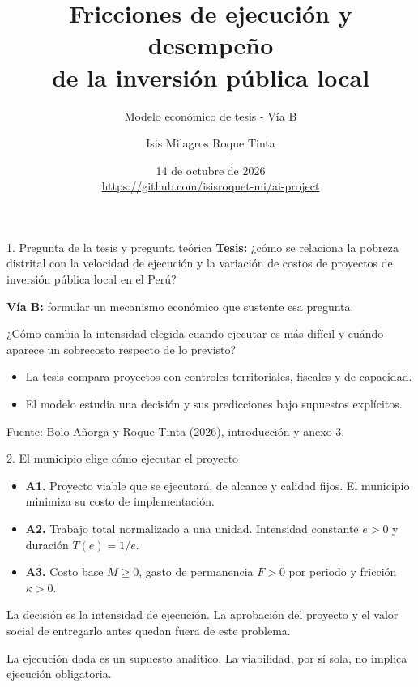 \documentclass[11pt,aspectratio=169]{beamer}
\title{Fricciones de ejecución y desempeño\\de la inversión pública local}
\subtitle{Modelo económico de tesis - Vía B}
\author{Isis Milagros Roque Tinta}
\institute{Universidad del Pacífico - Modelamiento Económico}
\date{14 de octubre de 2026\\[6pt]\small\url{https://github.com/isisroquet-mi/ai-project}}
\newcommand{\notefoot}[1]{\vfill{\scriptsize\color{navy!75}#1}}
\newcommand{\lead}[1]{\begin{block}{}#1\end{block}}
\begin{document}
\begin{frame}\titlepage\end{frame}

\begin{frame}{1. Pregunta de la tesis y pregunta teórica}
\textbf{Tesis:} ¿cómo se relaciona la pobreza distrital con la velocidad de ejecución y la variación de costos de proyectos de inversión pública local en el Perú?
\par\vspace{5mm}
\textbf{Vía B:} formular un mecanismo económico que sustente esa pregunta.
\lead{¿Cómo cambia la intensidad elegida cuando ejecutar es más difícil y cuándo aparece un sobrecosto respecto de lo previsto?}
\begin{itemize}
\item La tesis compara proyectos con controles territoriales, fiscales y de capacidad.
\item El modelo estudia una decisión y sus predicciones bajo supuestos explícitos.
\end{itemize}
\notefoot{Fuente: Bolo Añorga y Roque Tinta (2026), introducción y anexo 3.}
\end{frame}

\begin{frame}{2. El municipio elige cómo ejecutar el proyecto}
\begin{itemize}\setlength{\itemsep}{4mm}
\item \textbf{A1.} Proyecto viable que se ejecutará, de alcance y calidad fijos. El municipio minimiza su costo de implementación.
\item \textbf{A2.} Trabajo total normalizado a una unidad. Intensidad constante $e>0$ y duración $T(e)=1/e$.
\item \textbf{A3.} Costo base $M\geq0$, gasto de permanencia $F>0$ por periodo y fricción $\kappa>0$.
\end{itemize}
\lead{La decisión es la intensidad de ejecución. La aprobación del proyecto y el valor social de entregarlo antes quedan fuera de este problema.}
\notefoot{La ejecución dada es un supuesto analítico. La viabilidad, por sí sola, no implica ejecución obligatoria.}
\end{frame}
\end{document}
